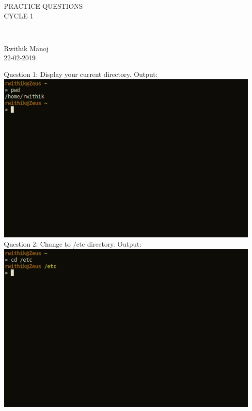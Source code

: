\documentclass[10pt,a4paper,titlepage]{report}
\begin{document}
\pagebreak
\hspace{0pt}
\vfill
\begin{center}
\begin{LARGE}
PRACTICE QUESTIONS\\
CYCLE 1
\end{LARGE}
\\
\begin{Large}
Rwithik Manoj\\
22-02-2019
\end{Large}
\end{center}
\vfill
\hspace{0pt}
\pagebreak
\newline
Question 1: Display your current directory.\newline
Output:\newline
\includegraphics[scale=.5]{../Images/Cycle2/1.png}\newline
\newline
Question 2: Change to /etc directory.\newline
Output:\newline
\includegraphics[scale=.5]{../Images/Cycle2/2.png}
\end{document}
